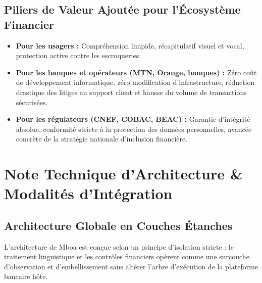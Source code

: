 \documentclass[10pt,a4paper]{article}
\begin{document}
\subsection{Piliers de Valeur Ajoutée pour l'Écosystème Financier}
\begin{itemize}
  \item \textbf{Pour les usagers :} Compréhension limpide, récapitulatif visuel et vocal, protection active contre les escroqueries.
  \item \textbf{Pour les banques et opérateurs (MTN, Orange, banques) :} Zéro coût de développement informatique, zéro modification d'infrastructure, réduction drastique des litiges au support client et hausse du volume de transactions sécurisées.
  \item \textbf{Pour les régulateurs (CNEF, COBAC, BEAC) :} Garantie d'intégrité absolue, conformité stricte à la protection des données personnelles, avancée concrète de la stratégie nationale d'inclusion financière.
\end{itemize}

\newpage

\section{Note Technique d'Architecture \& Modalités d'Intégration}

\subsection{Architecture Globale en Couches Étanches}
L'architecture de Mboa est conçue selon un principe d'isolation stricte : le traitement linguistique et les contrôles financiers opèrent comme une surcouche d'observation et d'embellissement sans altérer l'arbre d'exécution de la plateforme bancaire hôte.
\end{document}
